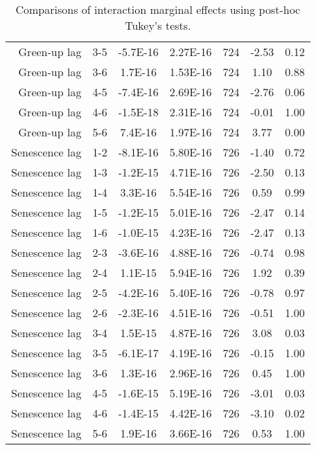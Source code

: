 \begin{table}[H]
\begin{tabular}{rcccccc}
  Green-up lag & 3-5 & -5.7E-16 & 2.27E-16 & 724 & -2.53 & 0.12 \\ 
  Green-up lag & 3-6 & 1.7E-16 & 1.53E-16 & 724 & 1.10 & 0.88 \\ 
  Green-up lag & 4-5 & -7.4E-16 & 2.69E-16 & 724 & -2.76 & 0.06 \\ 
  Green-up lag & 4-6 & -1.5E-18 & 2.31E-16 & 724 & -0.01 & 1.00 \\ 
  Green-up lag & 5-6 & 7.4E-16 & 1.97E-16 & 724 & 3.77 & 0.00 \\ 
  Senescence lag & 1-2 & -8.1E-16 & 5.80E-16 & 726 & -1.40 & 0.72 \\ 
  Senescence lag & 1-3 & -1.2E-15 & 4.71E-16 & 726 & -2.50 & 0.13 \\ 
  Senescence lag & 1-4 & 3.3E-16 & 5.54E-16 & 726 & 0.59 & 0.99 \\ 
  Senescence lag & 1-5 & -1.2E-15 & 5.01E-16 & 726 & -2.47 & 0.14 \\ 
  Senescence lag & 1-6 & -1.0E-15 & 4.23E-16 & 726 & -2.47 & 0.13 \\ 
  Senescence lag & 2-3 & -3.6E-16 & 4.88E-16 & 726 & -0.74 & 0.98 \\ 
  Senescence lag & 2-4 & 1.1E-15 & 5.94E-16 & 726 & 1.92 & 0.39 \\ 
  Senescence lag & 2-5 & -4.2E-16 & 5.40E-16 & 726 & -0.78 & 0.97 \\ 
  Senescence lag & 2-6 & -2.3E-16 & 4.51E-16 & 726 & -0.51 & 1.00 \\ 
  Senescence lag & 3-4 & 1.5E-15 & 4.87E-16 & 726 & 3.08 & 0.03 \\ 
  Senescence lag & 3-5 & -6.1E-17 & 4.19E-16 & 726 & -0.15 & 1.00 \\ 
  Senescence lag & 3-6 & 1.3E-16 & 2.96E-16 & 726 & 0.45 & 1.00 \\ 
  Senescence lag & 4-5 & -1.6E-15 & 5.19E-16 & 726 & -3.01 & 0.03 \\ 
  Senescence lag & 4-6 & -1.4E-15 & 4.42E-16 & 726 & -3.10 & 0.02 \\ 
  Senescence lag & 5-6 & 1.9E-16 & 3.66E-16 & 726 & 0.53 & 1.00 \\ 
  \end{tabular}
\caption{Comparisons of interaction marginal effects using post-hoc Tukey's tests.} 
\label{lsq_terms}
\end{table}

